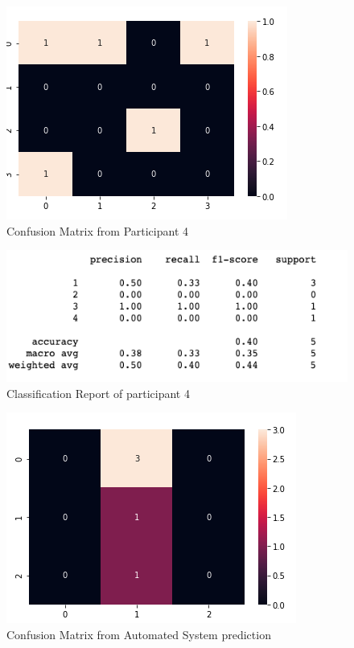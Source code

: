 \begin{figure}[!htp]
    \includegraphics[width=\textwidth]{Images/p4.png}
    \caption{Confusion Matrix from Participant 4}
    \label{fig:f11}
\end{figure}

\begin{figure}[!htp]
    \includegraphics[width=\textwidth]{Images/p4r.png}
    \caption{Classification Report of participant 4}
    \label{fig:f11}
\end{figure}

\pagebreak

\begin{figure}[!htp]
    \includegraphics[width=\textwidth]{Images/a4.png}
    \caption{Confusion Matrix from Automated System prediction}
    \label{fig:f11}
\end{figure}

